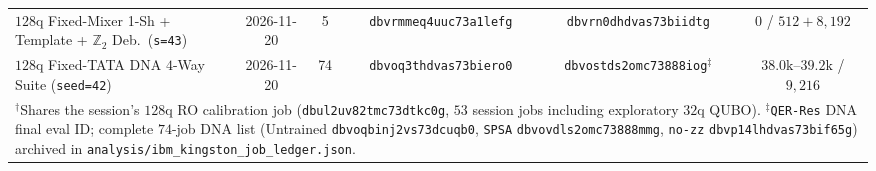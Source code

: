 \documentclass[11pt]{article}
\begin{document}
\begin{table}[ht!]
{\begin{tabular}{@{}lccccc@{}}
$128$q Fixed-Mixer 1-Sh + Template + $\mathbb{Z}_2$ Deb.\ (\texttt{s=43}) & 2026-11-20 & 5 & \texttt{dbvrmmeq4uuc73a1lefg} & \texttt{dbvrn0dhdvas73biidtg} & $0$ / $512{+}8{,}192$ \\
$128$q Fixed-TATA DNA $4$-Way Suite (\texttt{seed=42}) & 2026-11-20 & 74 & \texttt{dbvoq3thdvas73biero0} & \texttt{dbvostds2omc73888iog}$^\ddagger$ & $38.0\text{k}$--$39.2\text{k}$ / $9{,}216$ \\
\bottomrule
\multicolumn{6}{l}{\scriptsize $^\dagger$Shares the session's $128$q RO calibration job (\texttt{dbul2uv82tmc73dtkc0g}, $53$ session jobs including exploratory $32$q QUBO). $^\ddagger$\texttt{QER-Res} DNA final eval ID; complete $74$-job DNA list (Untrained \texttt{dbvoqbinj2vs73dcuqb0}, \texttt{SPSA} \texttt{dbvovdls2omc73888mmg}, \texttt{no-zz} \texttt{dbvp14lhdvas73bif65g}) archived in \nolinkurl{analysis/ibm_kingston_job_ledger.json}.}
\end{tabular}%
}
\end{table}
\end{document}
